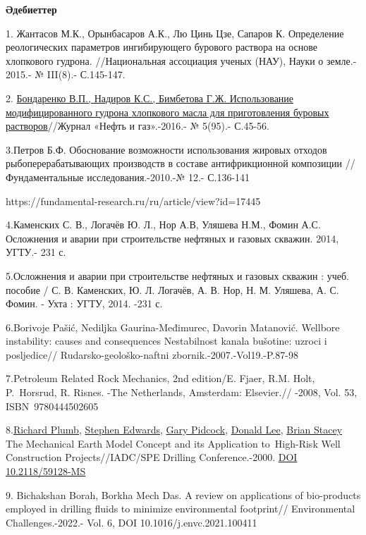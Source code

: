 \begin{center}
{\bfseries Әдебиеттер}
\end{center}

\begin{references}

1. Жантасов М.К., Орынбасаров А.К., Лю Цинь Цзе, Сапаров К. Определение
реологических параметров ингибирующего бурового раствора на основе
хлопкового гудрона. //Национальная ассоциация ученых (НАУ), Науки о
земле.- 2015.- № III(8).- С.145-147.

2.
\href{http://neft-gas.kz/f/no_5_2016_neft_i_gaz-dlya_sajta2-1.pdf}{Бондаренко
В.П., Надиров К.С., Бимбетова Г.Ж. Использование модифицированного
гудрона хлопкового масла для приготовления буровых растворов}//Журнал
«Нефть и газ».-2016.- № 5(95).- С.45-56.

3.Петров Б.Ф. Обоснование возможности использования жировых отходов
рыбоперерабатывающих производств в составе антифрикционной композиции //
Фундаментальные исследования.-2010.-№ 12.- С.136-141

https://fundamental-research.ru/ru/article/view?id=17445

4.Каменских С. В., Логачёв Ю. Л., Нор А.В, Уляшева Н.М., Фомин А.С.
Осложнения и аварии при строительстве нефтяных и газовых скважин. 2014,
УГТУ.- 231 с.

5.Осложнения и аварии при строительстве нефтяных и газовых скважин :
учеб. пособие / С. В. Каменских, Ю. Л. Логачёв, А. В. Нор, Н. М.
Уляшева, А. С. Фомин. - Ухта : УГТУ, 2014. -231 с.

6.Borivoje Pašić, Nediljka Gaurina-Međimurec, Davorin Matanović.
Wellbore instability: causes and consequences Nestabilnost kanala
bušotine: uzroci i posljedice// Rudarsko-geološko-naftni
zbornik.-2007.-Vol19.-P.87-98

7.Petroleum Related Rock Mechanics, 2nd edition/E. Fjaer, R.M. Holt,
P.~Horsrud, R. Risnes. -The Netherlands, Amsterdam: Elsevier.// -2008,
Vol. 53, ISBN~9780444502605

8.\href{javascript:;}{Richard Plumb}, \href{javascript:;}{Stephen
Edwards}, \href{javascript:;}{Gary Pidcock}, \href{javascript:;}{Donald
Lee}, \href{javascript:;}{Brian Stacey} The Mechanical Earth Model
Concept and its Application to~High-Risk Well Construction
Projects//IADC/SPE Drilling Conference.-2000.
\href{https://doi.org/10.2118/59128-MS}{DOI 10.2118/59128-MS}

9. Bichakshan Borah, Borkha Mech Das. A review on applications of
bio-products employed in drilling fluids to minimize environmental
footprint// Environmental Challenges.-2022.- Vol. 6, DOI
10.1016/j.envc.2021.100411


\end{references}
